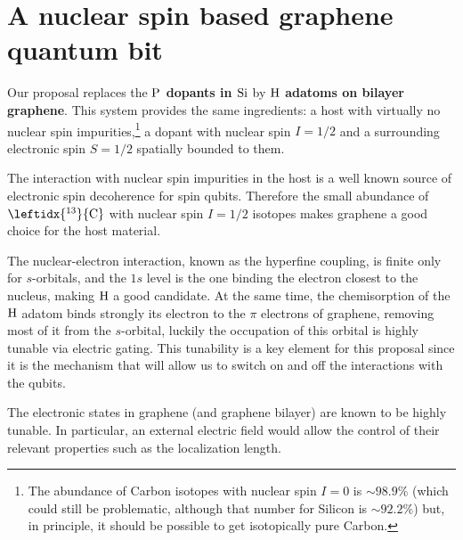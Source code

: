 \section{A nuclear spin based graphene quantum bit}
Our proposal replaces the \textbf{$\ce{P}$ dopants in $\ce{Si}$} by \textbf{$\ce{H}$ adatoms on bilayer graphene}.
This system provides the same ingredients: a host with virtually no nuclear spin impurities,\footnote{The abundance of Carbon isotopes with nuclear spin $I=0$ is $\sim98.9\%$ (which could still be problematic, although that number for Silicon is $\sim92.2\%$) but, in principle, it should be possible to get isotopically pure Carbon.} a dopant with nuclear spin $I=1/2$ and a surrounding electronic spin $S=1/2$ spatially bounded to them.


The interaction with nuclear spin impurities in the host is a well known source of electronic spin decoherence for spin qubits\cite{khaetskii2002}. %
Therefore the small abundance of $\leftidx{^{13}}{\ce{C}}$ with nuclear spin $I=1/2$ isotopes makes graphene a good choice for the host material.

The nuclear-electron interaction, known as the hyperfine coupling, is finite only for $s$-orbitals, and the $1s$ level is the one binding the electron closest to the nucleus, making $\ce{H}$ a good candidate.
%
At the same time, the chemisorption of the $\ce{H}$ adatom binds strongly its electron to the $\pi$ electrons of graphene, removing most of it from the $s$-orbital, luckily the occupation of this orbital is highly tunable via electric gating. This tunability is a key element for this proposal since it is the mechanism that will allow us to switch on and off the interactions with the qubits.
\smallskip








The electronic states in graphene (and graphene bilayer) are known to be highly tunable. In particular, an external electric field would allow the control of their relevant properties such as the localization length.

